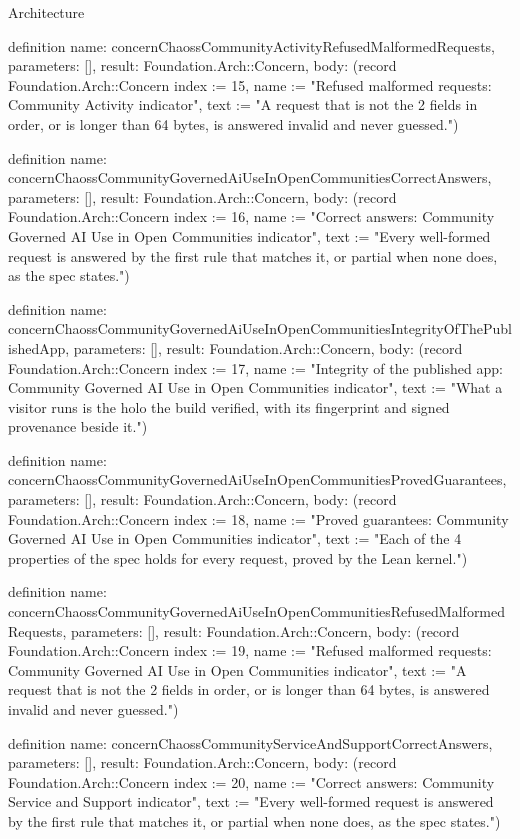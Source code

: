 \begin{lexlean}{Architecture}
\begin{semanticmodule}
definition{
  name: concernChaossCommunityActivityRefusedMalformedRequests,
  parameters: [],
  result: Foundation.Arch::Concern,
  body: (record Foundation.Arch::Concern {index := 15, name := "Refused malformed requests: Community Activity indicator", text := "A request that is not the 2 fields in order, or is longer than 64 bytes, is answered invalid and never guessed."})
}

definition{
  name: concernChaossCommunityGovernedAiUseInOpenCommunitiesCorrectAnswers,
  parameters: [],
  result: Foundation.Arch::Concern,
  body: (record Foundation.Arch::Concern {index := 16, name := "Correct answers: Community Governed AI Use in Open Communities indicator", text := "Every well-formed request is answered by the first rule that matches it, or partial when none does, as the spec states."})
}

definition{
  name: concernChaossCommunityGovernedAiUseInOpenCommunitiesIntegrityOfThePublishedApp,
  parameters: [],
  result: Foundation.Arch::Concern,
  body: (record Foundation.Arch::Concern {index := 17, name := "Integrity of the published app: Community Governed AI Use in Open Communities indicator", text := "What a visitor runs is the holo the build verified, with its fingerprint and signed provenance beside it."})
}

definition{
  name: concernChaossCommunityGovernedAiUseInOpenCommunitiesProvedGuarantees,
  parameters: [],
  result: Foundation.Arch::Concern,
  body: (record Foundation.Arch::Concern {index := 18, name := "Proved guarantees: Community Governed AI Use in Open Communities indicator", text := "Each of the 4 properties of the spec holds for every request, proved by the Lean kernel."})
}

definition{
  name: concernChaossCommunityGovernedAiUseInOpenCommunitiesRefusedMalformedRequests,
  parameters: [],
  result: Foundation.Arch::Concern,
  body: (record Foundation.Arch::Concern {index := 19, name := "Refused malformed requests: Community Governed AI Use in Open Communities indicator", text := "A request that is not the 2 fields in order, or is longer than 64 bytes, is answered invalid and never guessed."})
}

definition{
  name: concernChaossCommunityServiceAndSupportCorrectAnswers,
  parameters: [],
  result: Foundation.Arch::Concern,
  body: (record Foundation.Arch::Concern {index := 20, name := "Correct answers: Community Service and Support indicator", text := "Every well-formed request is answered by the first rule that matches it, or partial when none does, as the spec states."})
}


\end{semanticmodule}
\end{lexlean}
